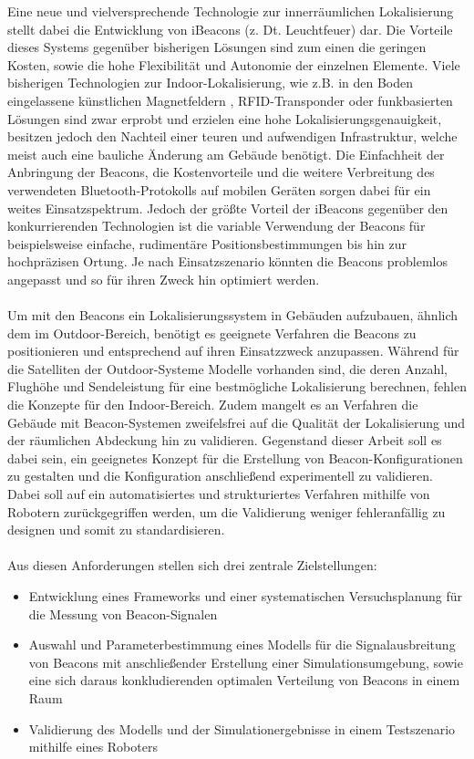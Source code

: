Eine neue und vielversprechende Technologie zur innerräumlichen Lokalisierung stellt dabei die Entwicklung von iBeacons (z. Dt. Leuchtfeuer) dar. Die Vorteile dieses Systems gegenüber bisherigen Lösungen sind zum einen die geringen Kosten, sowie die hohe Flexibilität und Autonomie der einzelnen Elemente. Viele bisherigen Technologien zur Indoor-Lokalisierung, wie z.B. in den Boden eingelassene künstlichen Magnetfeldern \cite{Magnet}, RFID-Transponder \cite{RFID} oder funkbasierten Lösungen\citep{WLAN} sind zwar erprobt und erzielen eine hohe Lokalisierungsgenauigkeit, besitzen jedoch den Nachteil einer teuren und aufwendigen Infrastruktur, welche meist auch eine bauliche Änderung am Gebäude benötigt. Die Einfachheit der Anbringung der Beacons, die Kostenvorteile und die weitere Verbreitung des verwendeten Bluetooth-Protokolls auf mobilen Geräten sorgen dabei für ein weites Einsatzspektrum. Jedoch der größte Vorteil der iBeacons gegenüber den konkurrierenden Technologien ist die variable Verwendung der Beacons für beispielsweise einfache, rudimentäre Positionsbestimmungen bis hin zur hochpräzisen Ortung. Je nach Einsatzszenario könnten die Beacons problemlos angepasst und so für ihren Zweck hin optimiert werden.\\ \\
Um mit den Beacons ein Lokalisierungssystem in Gebäuden aufzubauen, ähnlich dem im Outdoor-Bereich, benötigt es geeignete Verfahren die Beacons zu positionieren und entsprechend auf ihren Einsatzzweck anzupassen. Während für die Satelliten der Outdoor-Systeme Modelle vorhanden sind, die deren Anzahl, Flughöhe und Sendeleistung für eine bestmögliche Lokalisierung berechnen, fehlen die Konzepte für den Indoor-Bereich. Zudem mangelt es an Verfahren die Gebäude mit Beacon-Systemen zweifelsfrei auf die Qualität der Lokalisierung und der räumlichen Abdeckung hin zu validieren. Gegenstand dieser Arbeit soll es dabei sein, ein geeignetes Konzept für die Erstellung von Beacon-Konfigurationen zu gestalten und die Konfiguration anschließend experimentell zu validieren. Dabei soll auf ein automatisiertes und strukturiertes Verfahren mithilfe von Robotern zurückgegriffen werden, um die Validierung weniger fehleranfällig zu designen und somit zu standardisieren.\\ \\
Aus diesen Anforderungen stellen sich drei zentrale Zielstellungen:
\begin{itemize}
\item Entwicklung eines Frameworks und einer systematischen Versuchsplanung für die Messung von Beacon-Signalen
\item Auswahl und Parameterbestimmung eines Modells für die Signalausbreitung von Beacons mit anschließender Erstellung einer Simulationsumgebung, sowie eine sich daraus konkludierenden optimalen Verteilung von Beacons in einem Raum 
\item Validierung des Modells und der Simulationergebnisse in einem Testszenario mithilfe eines Roboters  
\end{itemize}
